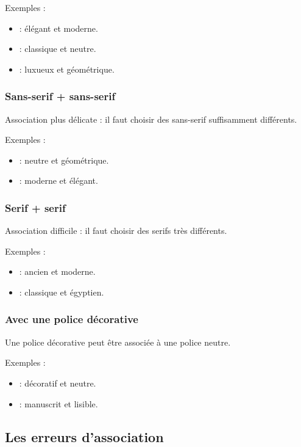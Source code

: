 Exemples :
\begin{itemize}
    \item {} : élégant et moderne.
    \item {} : classique et neutre.
    \item {} : luxueux et géométrique.
\end{itemize}

\subsubsection{Sans-serif + sans-serif}

Association plus délicate : il faut choisir des sans-serif suffisamment différents.

Exemples :
\begin{itemize}
    \item {} : neutre et géométrique.
    \item {} : moderne et élégant.
\end{itemize}

\subsubsection{Serif + serif}

Association difficile : il faut choisir des serifs très différents.

Exemples :
\begin{itemize}
    \item {} : ancien et moderne.
    \item {} : classique et égyptien.
\end{itemize}

\subsubsection{Avec une police décorative}

Une police décorative peut être associée à une police neutre.

Exemples :
\begin{itemize}
    \item {} : décoratif et neutre.
    \item {} : manuscrit et lisible.
\end{itemize}

\subsection{Les erreurs d'association}

